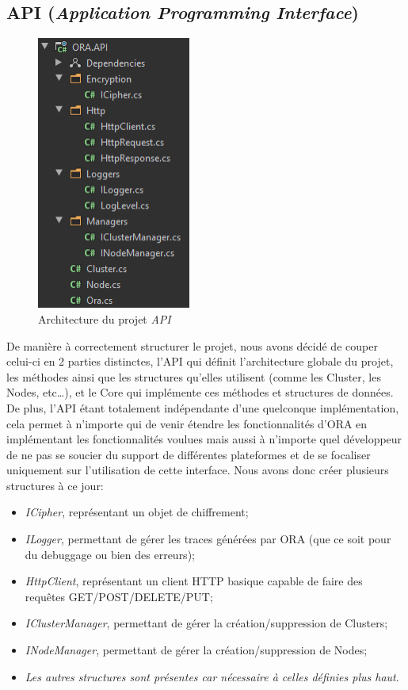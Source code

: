 \documentclass[11pt, a4paper]{report}
\begin{document}
    \subsection{API (\textit{Application Programming Interface})}
      \begin{figure}
        \centering
        \includegraphics[height=9cm]{assets/presentation1/api.png}
        \caption{Architecture du projet \textit{API}}
      \end{figure}
      De manière à correctement structurer le projet, nous avons décidé de couper celui-ci en 2 parties distinctes, l'API qui définit l'architecture globale du projet, les méthodes ainsi que les structures qu'elles utilisent (comme les Cluster, les Nodes, etc\ldots), et le Core qui implémente ces méthodes et structures de données. De plus, l'API étant totalement indépendante d'une quelconque implémentation, cela permet à n'importe qui de venir étendre les fonctionnalités d'ORA en implémentant les fonctionnalités voulues mais aussi à n'importe quel développeur de ne pas se soucier du support de différentes plateformes et de se focaliser uniquement sur l'utilisation de cette interface.\newline
      Nous avons donc créer plusieurs structures à ce jour:
      \begin{itemize}
          \item \textit{ICipher}, représentant un objet de chiffrement;
          \item \textit{ILogger}, permettant de gérer les traces générées par ORA (que ce soit pour du debuggage ou bien des erreurs);
          \item \textit{HttpClient}, représentant un client HTTP basique capable de faire des requêtes GET/POST/DELETE/PUT;
          \item \textit{IClusterManager}, permettant de gérer la création/suppression de Clusters;
          \item \textit{INodeManager}, permettant de gérer la création/suppression de Nodes;
          \item \textit{Les autres structures sont présentes car nécessaire à celles définies plus haut}.
      \end{itemize}
\end{document}
